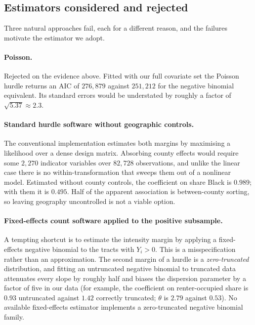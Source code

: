 \subsection{Estimators considered and rejected}

Three natural approaches fail, each for a different reason, and the failures
motivate the estimator we adopt.

\paragraph{Poisson.} Rejected on the evidence above. Fitted with our full
covariate set the Poisson hurdle returns an AIC of $276{,}879$ against
$251{,}212$ for the negative binomial equivalent. Its standard errors would be
understated by roughly a factor of $\sqrt{5.37} \approx 2.3$.

\paragraph{Standard hurdle software without geographic controls.} The
conventional implementation \citep[\texttt{pscl};][]{Zeileis2008} estimates
both margins by maximising a likelihood over a dense design matrix. Absorbing
county effects would require some $2{,}270$ indicator variables over $82{,}728$
observations, and unlike the linear case there is no within-transformation that
sweeps them out of a nonlinear model. Estimated without county controls, the
coefficient on share Black is $0.989$; with them it is $0.495$. Half of the
apparent association is between-county sorting, so leaving geography
uncontrolled is not a viable option.

\paragraph{Fixed-effects count software applied to the positive subsample.} A
tempting shortcut is to estimate the intensity margin by applying a
fixed-effects negative binomial to the tracts with $Y_i > 0$. This is a
misspecification rather than an approximation. The second margin of a hurdle is
a \emph{zero-truncated} distribution, and fitting an untruncated negative
binomial to truncated data attenuates every slope by roughly half and biases
the dispersion parameter by a factor of five in our data (for example, the
coefficient on renter-occupied share is $0.93$ untruncated against $1.42$
correctly truncated; $\theta$ is $2.79$ against $0.53$). No available
fixed-effects estimator implements a zero-truncated negative binomial family.

